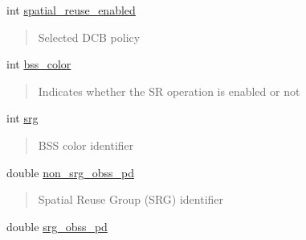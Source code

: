 \begin{DoxyCompactItemize}
int \hyperlink{structConfiguration_a662755287ac7f9ab73d7cde91a4b5b97}{spatial\+\_\+reuse\+\_\+enabled}
\begin{DoxyCompactList}\small\item\em \begin{quote}
Selected D\+CB policy \end{quote}
\end{DoxyCompactList}\item 
\mbox{\label{structConfiguration_a9c1c3540d5ba4adc060d907eb7f03a0e}} 
int \hyperlink{structConfiguration_a9c1c3540d5ba4adc060d907eb7f03a0e}{bss\+\_\+color}
\begin{DoxyCompactList}\small\item\em \begin{quote}
Indicates whether the SR operation is enabled or not \end{quote}
\end{DoxyCompactList}\item 
\mbox{\label{structConfiguration_a1f79d1e2260dfb2b597da33a05e9d7ca}} 
int \hyperlink{structConfiguration_a1f79d1e2260dfb2b597da33a05e9d7ca}{srg}
\begin{DoxyCompactList}\small\item\em \begin{quote}
B\+SS color identifier \end{quote}
\end{DoxyCompactList}\item 
\mbox{\label{structConfiguration_ad626957d7ff75b7a49f6b8f99242c249}} 
double \hyperlink{structConfiguration_ad626957d7ff75b7a49f6b8f99242c249}{non\+\_\+srg\+\_\+obss\+\_\+pd}
\begin{DoxyCompactList}\small\item\em \begin{quote}
Spatial Reuse Group (S\+RG) identifier \end{quote}
\end{DoxyCompactList}\item 
\mbox{\label{structConfiguration_a3f4333c7b63a3e5bfb57967ed25c6ad6}} 
double \hyperlink{structConfiguration_a3f4333c7b63a3e5bfb57967ed25c6ad6}{srg\+\_\+obss\+\_\+pd}
\begin{DoxyCompactList}\small\item\em \begin{quote}

\end{quote}
\end{DoxyCompactList}
\end{DoxyCompactItemize}

